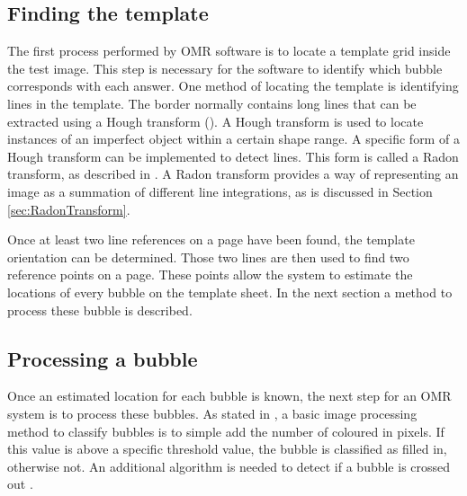 \subsection{Finding the template}

The first process performed by OMR software is to locate a template grid inside the test image. This step is necessary for the software to identify which bubble corresponds with each answer. One method of locating the template is identifying lines in the template. The border normally contains long lines that can be extracted using a Hough transform (\citet{MVGI2015}). A Hough transform is used to locate instances of an imperfect object within a certain shape range. A specific form of a Hough transform can be implemented to detect lines. This form is called a Radon transform, as described in \citet{MathWorks}. A Radon transform provides a way of representing an image as a summation of different line integrations, as is discussed in Section \ref{sec:RadonTransform}. 

Once at least two line references on a page have been found, the template orientation can be determined. Those two lines are then used to find two reference points on a page. These points allow the system to estimate the locations of every bubble on the template sheet. In the next section a method to process these bubble is described.

\subsection{Processing a bubble}

Once an estimated location for each bubble is known, the next step for an OMR system is to process these bubbles. As stated in \citet{MVGI2015}, a basic image processing method to classify bubbles is to simple add the number of coloured in pixels. If this value is above a specific threshold value, the bubble is classified as filled in, otherwise not. An additional algorithm is needed to detect if a bubble is crossed out .

